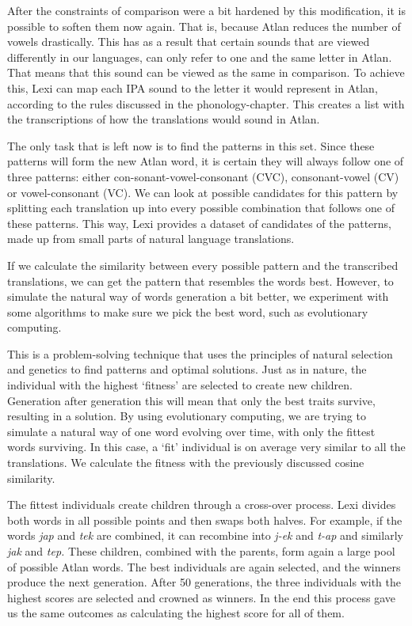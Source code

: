 After the constraints of comparison were a bit hardened by this modification, it is possible to soften them now again. That is, because Atlan reduces the number of vowels drastically. This has as a result that certain sounds that are viewed differently in our languages, can only refer to one and the same letter in Atlan. That means that this sound can be viewed as the same in comparison. To achieve this, Lexi can map each IPA sound to the letter it would represent in Atlan, according to the rules discussed in the phonology-chapter. This creates a list with the transcriptions of how the translations would sound in Atlan.  

The only task that is left now is to find the patterns in this set. Since these patterns will form the new Atlan word, it is certain they will always follow one of three patterns: either con-sonant-vowel-consonant (CVC), consonant-vowel (CV) or vowel-consonant (VC). We can look at possible candidates for this pattern by splitting each translation up into every possible combination that follows one of these patterns. This way, Lexi provides a dataset of candidates of the patterns, made up from small parts of natural language translations. 

If we calculate the similarity between every possible pattern and the transcribed translations, we can get the pattern that resembles the words best. However, to simulate the natural way of words generation a bit better, we experiment with some algorithms to make sure we pick the best word, such as evolutionary computing. 

This is a problem-solving technique that uses the principles of natural selection and genetics to find patterns and optimal solutions. Just as in nature, the individual with the highest ‘fitness’ are selected to create new children. Generation after generation this will mean that only the best traits survive, resulting in a solution. By using evolutionary computing, we are trying to simulate a natural way of one word evolving over time, with only the fittest words surviving. In this case, a ‘fit’ individual is on average very similar to all the translations. We calculate the fitness with the previously discussed cosine similarity. 

The fittest individuals create children through a cross-over process. Lexi divides both words in all possible points and then swaps both halves.  For example, if the words \textit{jap} and \textit{tek} are combined, it can recombine into \textit{j-ek} and \textit{t-ap} and similarly \textit{jak} and \textit{tep.} These children, combined with the parents, form again a large pool of possible Atlan words. The best individuals are again selected, and the winners produce the next generation. After 50 generations, the three individuals with the highest scores are selected and crowned as winners. In the end this process gave us the same outcomes as calculating the highest score for all of them. 

